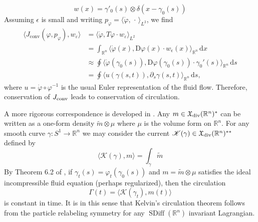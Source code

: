 \documentclass[12pt]{amsart}
\newcommand{\R}{\ensuremath{\mathbb{R}}}
\DeclareMathOperator{\SDiff}{SDiff}
\begin{document}
\begin{equation*}
  w(x) =  \gamma'_0(s) \otimes \delta(x-\gamma_0(s))
\end{equation*}
Assuming $\epsilon$ is small and writing 
$p_\varphi = \langle \dot{\varphi} , \,\cdot\, \rangle_{L^2}$, we find
\begin{align*}
  \langle J_\text{conv}(\varphi,p_\varphi) , w_\varepsilon \rangle
  &= \langle \dot{\varphi} , T\varphi \cdot w_\varepsilon \rangle_{L^2}\\
  &= \int_{\mathbb{R}^n} \langle \dot{\varphi}(x) , \textrm{D}\varphi(x)\cdot w_\epsilon(x) \rangle_{\mathbb{R}^n} \,\textrm{d} x \\
  &\approx \oint \langle \dot{\varphi}(\gamma_0(s)) , \textrm{D}\varphi(\gamma_0(s))\cdot \gamma_0'(s) \rangle_{\mathbb{R}^n} \,\textrm{d} s \\
  &= \oint \langle u(\gamma(s,t)) , \partial_s \gamma(s,t) \rangle_{\mathbb{R}^n} \,\textrm{d} s,
\end{align*}
where $u = \dot{\varphi}\circ\varphi^{-1}$ is the usual Euler
representation of the fluid flow. 
Therefore, conservation of $J_{\rm conv}$ leads to conservation of circulation.

A more rigorous correspondence is developed in \cite{HolmMarsdenRatiu1998}.
Any $m \in \mathfrak{X}_{\rm div}(\R^n)^*$ can be written as a one-form density $\tilde{m} \otimes \mu$
where $\mu$ is the volume form on $\R^n$.
For any smooth curve $\gamma:S^1 \to \R^n$ we may consider the current
$\mathscr{K}(\gamma) \in \mathfrak{X}_{\rm div}(\R^n)^{**}$ defined by
\begin{equation*}
	\langle \mathscr{K}(\gamma) , m \rangle = \int_{\gamma} \tilde{m}
\end{equation*}
By Theorem 6.2 of \cite{HolmMarsdenRatiu1998}, if $\gamma_t(s) = \varphi_t(\gamma_0(s))$ and $m = \tilde{m} \otimes \mu$ satisfies
the ideal incompressible fluid equation (perhaps regularized), then the circulation
\begin{equation*}
	\Gamma(t) = \langle \mathscr{K}(\gamma_t) , m(t) \rangle
\end{equation*}
is constant in time.
It is in this sense that Kelvin's circulation theorem follows from the particle
relabeling symmetry for any $\SDiff(\R^n)$ invariant Lagrangian. 
\end{document}
